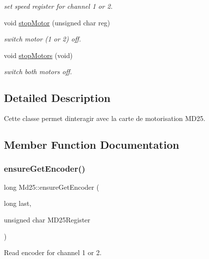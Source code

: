 \begin{DoxyCompactItemize}
\begin{DoxyCompactList}\small\item\em set speed register for channel 1 or 2. \end{DoxyCompactList}\item 
void \hyperlink{classMd25_a009f1a95005464e6f1cf06a81bb2319f}{stop\+Motor} (unsigned char reg)
\begin{DoxyCompactList}\small\item\em switch motor (1 or 2) off. \end{DoxyCompactList}\item 
\mbox{\label{classMd25_ada207481d3843059ee542290cf2d7572}} 
void \hyperlink{classMd25_ada207481d3843059ee542290cf2d7572}{stop\+Motors} (void)
\begin{DoxyCompactList}\small\item\em switch both motors off. \end{DoxyCompactList}\end{DoxyCompactItemize}


\subsection{Detailed Description}
Cette classe permet d\textquotesingle{}interagir avec la carte de motorisation M\+D25. 

\subsection{Member Function Documentation}
\mbox{\label{classMd25_a7ae9bff45c48099fe56746360135a660}} 
\subsubsection{\texorpdfstring{ensure\+Get\+Encoder()}{ensureGetEncoder()}}
{\footnotesize\ttfamily long Md25\+::ensure\+Get\+Encoder (\begin{DoxyParamCaption}\item[{long}]{last,  }\item[{unsigned char}]{M\+D25\+Register }\end{DoxyParamCaption})}



Read encoder for channel 1 or 2. 

